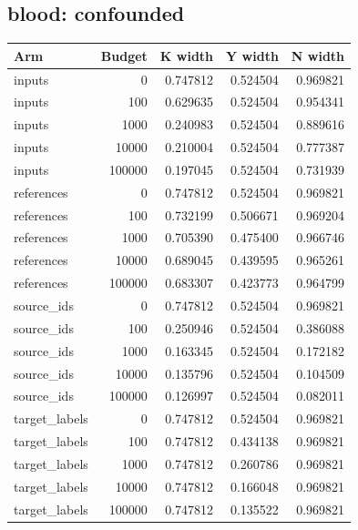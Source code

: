 \reservetable
\subsection{blood: confounded}

\begingroup\small
\setlength{\tabcolsep}{4pt}
\begin{longtable}{lrrrr}
\toprule

Arm & Budget & K width & Y width & N width\\\midrule\endhead

inputs & 0 & 0.747812 & 0.524504 & 0.969821\\

inputs & 100 & 0.629635 & 0.524504 & 0.954341\\

inputs & 1000 & 0.240983 & 0.524504 & 0.889616\\

inputs & 10000 & 0.210004 & 0.524504 & 0.777387\\

inputs & 100000 & 0.197045 & 0.524504 & 0.731939\\

references & 0 & 0.747812 & 0.524504 & 0.969821\\

references & 100 & 0.732199 & 0.506671 & 0.969204\\

references & 1000 & 0.705390 & 0.475400 & 0.966746\\

references & 10000 & 0.689045 & 0.439595 & 0.965261\\

references & 100000 & 0.683307 & 0.423773 & 0.964799\\

source\_ids & 0 & 0.747812 & 0.524504 & 0.969821\\

source\_ids & 100 & 0.250946 & 0.524504 & 0.386088\\

source\_ids & 1000 & 0.163345 & 0.524504 & 0.172182\\

source\_ids & 10000 & 0.135796 & 0.524504 & 0.104509\\

source\_ids & 100000 & 0.126997 & 0.524504 & 0.082011\\

target\_labels & 0 & 0.747812 & 0.524504 & 0.969821\\

target\_labels & 100 & 0.747812 & 0.434138 & 0.969821\\

target\_labels & 1000 & 0.747812 & 0.260786 & 0.969821\\

target\_labels & 10000 & 0.747812 & 0.166048 & 0.969821\\

target\_labels & 100000 & 0.747812 & 0.135522 & 0.969821\\

\bottomrule
\end{longtable}
\endgroup

